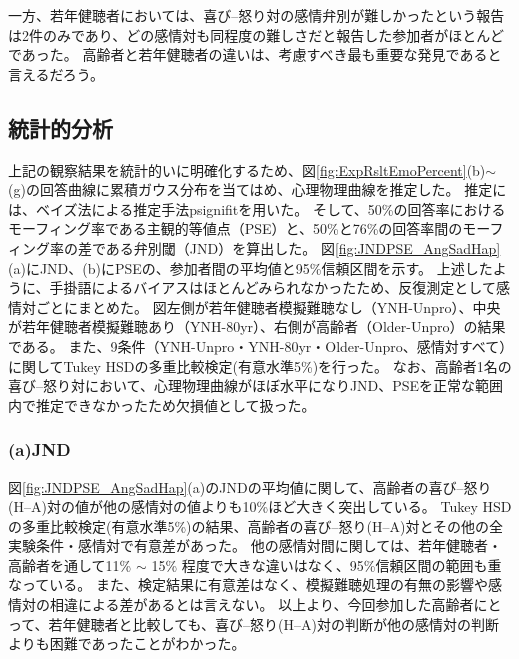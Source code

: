 一方、若年健聴者においては、喜び--怒り対の感情弁別が難しかったという報告は2件のみであり、どの感情対も同程度の難しさだと報告した参加者がほとんどであった。
高齢者と若年健聴者の違いは、考慮すべき最も重要な発見であると言えるだろう。






\clearpage
\subsection{統計的分析}
\label{sec:Statistics}
上記の観察結果を統計的いに明確化するため、図\ref{fig:ExpRsltEmoPercent}(b)$\sim$(g)の回答曲線に累積ガウス分布を当てはめ、心理物理曲線を推定した。
推定には、ベイズ法による推定手法psignifit\cite{schutt2016painfree}を用いた。
そして、50\%の回答率におけるモーフィング率である主観的等値点（PSE）と、50\%と76\%の回答率間のモーフィング率の差である弁別閾（JND）を算出した。 
図\ref{fig:JNDPSE_AngSadHap}(a)にJND、(b)にPSEの、参加者間の平均値と95\%信頼区間を示す。
上述したように、手掛語によるバイアスはほとんどみられなかったため、反復測定として感情対ごとにまとめた。
図左側が若年健聴者模擬難聴なし（YNH-Unpro）、中央が若年健聴者模擬難聴あり（YNH-80yr）、右側が高齢者（Older-Unpro）の結果である。
また、9条件（YNH-Unpro・YNH-80yr・Older-Unpro、感情対すべて）に関してTukey HSDの多重比較検定(有意水準5\%)を行った。
なお、高齢者1名の喜び--怒り対において、心理物理曲線がほぼ水平になりJND、PSEを正常な範囲内で推定できなかったため欠損値として扱った。

\subsubsection{(a)JND}
図\ref{fig:JNDPSE_AngSadHap}(a)のJNDの平均値に関して、高齢者の喜び--怒り(H--A)対の値が他の感情対の値よりも10\%ほど大きく突出している。
Tukey HSDの多重比較検定(有意水準5\%)の結果、高齢者の喜び--怒り(H--A)対とその他の全実験条件・感情対で有意差があった。
他の感情対間に関しては、若年健聴者・高齢者を通して11\% $\sim$ 15\% 程度で大きな違いはなく、95\%信頼区間の範囲も重なっている。 
また、検定結果に有意差はなく、模擬難聴処理の有無の影響や感情対の相違による差があるとは言えない。
以上より、今回参加した高齢者にとって、若年健聴者と比較しても、喜び--怒り(H--A)対の判断が他の感情対の判断よりも困難であったことがわかった。

